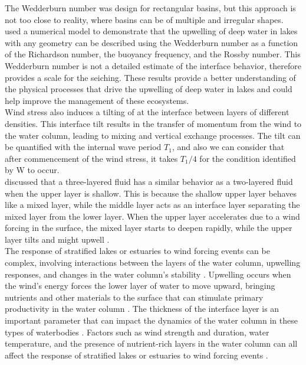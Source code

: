 \documentclass[tesis.tex]{subfiles}
\begin{document}
The Wedderburn number was design for rectangular basins, but this approach is not too close to reality, where basins can be of multiple and irregular shapes. \cite{Shintani2010} used a numerical model to demonstrate that the upwelling of deep water in lakes with any geometry can be described using the Wedderburn number as a function of the Richardson number, the buoyancy frequency, and the Rossby number. This Wedderburn number is not a detailed estimate of the interface behavior, therefore provides a scale for the seiching. These results provide a better understanding of the physical processes that drive the upwelling of deep water in lakes and could help improve the management of these ecosystems.\\

Wind stress also induces a tilting of at the interface between layers of different densities. This interface tilt results in the transfer of momentum from the wind to the water column, leading to mixing and vertical exchange processes. The tilt can be quantified with the internal wave period $T_1$, and also we can consider that after commencement of the wind stress, it takes $T_1/4$ for the condition identified by W to occur.\\

\cite{Monismith1985} discussed that a three-layered fluid has a similar behavior as a two-layered fluid when the upper layer is shallow. This is because the shallow upper layer behaves like a mixed layer, while the middle layer acts as an interface layer separating the mixed layer from the lower layer. When the upper layer accelerates due to a wind forcing in the surface, the mixed layer starts to deepen rapidly, while the upper layer tilts and might upwell \citep{monismith2006vertical}.\\

The response of stratified lakes or estuaries to wind forcing events can be complex, involving interactions between the layers of the water column, upwelling responses, and changes in the water column's stability \citep{jayaweera2019turbulent}. Upwelling occurs when the wind's energy forces the lower layer of water to move upward, bringing nutrients and other materials to the surface that can stimulate primary productivity in the water column \citep{bastidas2021comparison}. The thickness of the interface layer is an important parameter that can impact the dynamics of the water column in these types of waterbodies \citep{xu2017vertical}. Factors such as wind strength and duration, water temperature, and the presence of nutrient-rich layers in the water column can all affect the response of stratified lakes or estuaries to wind forcing events \citep{nidheesh2018stratification}.\\
\end{document}
